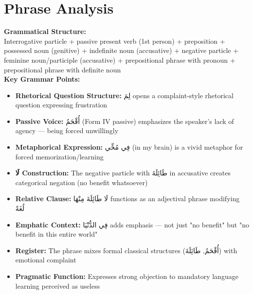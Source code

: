 \documentclass[letterpaper,12pt]{article}
\begin{document}
\section{Phrase Analysis}
\begin{tcolorbox}[colback=boxcolor,colframe=headercolor,breakable]
\textbf{Grammatical Structure:}\\
Interrogative particle + passive present verb (1st person) + preposition + possessed noun (genitive) + indefinite noun (accusative) + negative particle + feminine noun/participle (accusative) + prepositional phrase with pronoun + prepositional phrase with definite noun \\[0.5em]

\textbf{Key Grammar Points:}
\begin{itemize}
\item \textbf{Rhetorical Question Structure:} \textarabic{لِمَ} opens a complaint-style rhetorical question expressing frustration
\item \textbf{Passive Voice:} \textarabic{أُقْحَمُ} (Form IV passive) emphasizes the speaker's lack of agency — being forced unwillingly
\item \textbf{Metaphorical Expression:} \textarabic{فِي مُخِّي} (in my brain) is a vivid metaphor for forced memorization/learning
\item \textbf{\textarabic{لَا} Construction:} The negative particle with \textarabic{طَائِلَةَ} in accusative creates categorical negation (no benefit whatsoever)
\item \textbf{Relative Clause:} \textarabic{لَا طَائِلَةَ مِنْهَا} functions as an adjectival phrase modifying \textarabic{لُغَةً}
\item \textbf{Emphatic Context:} \textarabic{فِي الدُّنْيَا} adds emphasis — not just "no benefit" but "no benefit in this entire world"
\item \textbf{Register:} The phrase mixes formal classical structures (\textarabic{أُقْحَمُ}, \textarabic{طَائِلَةَ}) with emotional complaint
\item \textbf{Pragmatic Function:} Expresses strong objection to mandatory language learning perceived as useless
\end{itemize}
\end{tcolorbox}
\end{document}
